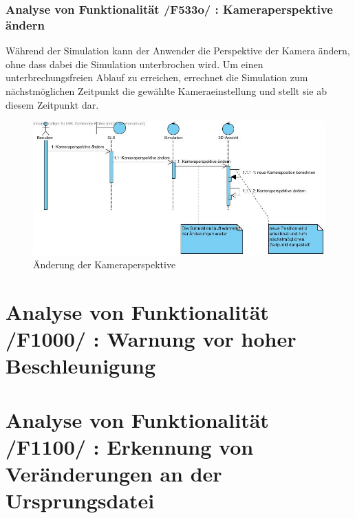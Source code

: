 \subsubsection{Analyse von Funktionalität /F533o/ :  Kameraperspektive ändern}
Während der Simulation kann der Anwender die Perspektive der Kamera ändern, ohne dass dabei die Simulation unterbrochen wird. Um einen unterbrechungsfreien Ablauf zu erreichen, errechnet die Simulation zum nächstmöglichen Zeitpunkt die gewählte Kameraeinstellung und stellt sie ab diesem Zeitpunkt dar. 
\begin{figure}
\includegraphics[width=\linewidth]{bilder/Kameraperspektive.jpg}
\caption{Änderung der Kameraperspektive}
\label{Kameraperspektive}
\end{figure}
\section{Analyse von Funktionalität /F1000/ :  Warnung vor hoher Beschleunigung}
\section{Analyse von Funktionalität /F1100/ :  Erkennung von Veränderungen an der Ursprungsdatei}
